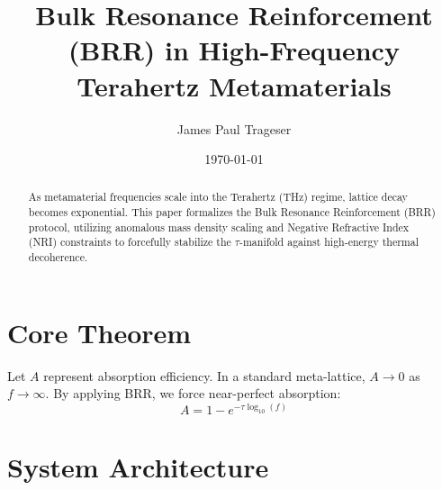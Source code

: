 \documentclass[reprint,aps,prl,twocolumn,superscriptaddress,amsmath,amssymb]{revtex4-2}
\begin{document}
\title{Bulk Resonance Reinforcement (BRR) in High-Frequency Terahertz Metamaterials}

\author{James Paul Trageser}

\date{\today}

\begin{abstract}
As metamaterial frequencies scale into the Terahertz (THz) regime, lattice decay becomes exponential. This paper formalizes the Bulk Resonance Reinforcement (BRR) protocol, utilizing anomalous mass density scaling and Negative Refractive Index (NRI) constraints to forcefully stabilize the $\tau$-manifold against high-energy thermal decoherence.
\end{abstract}

\maketitle

\section{Core Theorem}
Let $A$ represent absorption efficiency. In a standard meta-lattice, $A \to 0$ as $f \to \infty$. By applying BRR, we force near-perfect absorption:
\begin{equation}
    A = 1 - e^{-\tau \log_{10}(f)}
\end{equation}

\section{System Architecture}
\begin{center}
\end{center}
\end{document}
